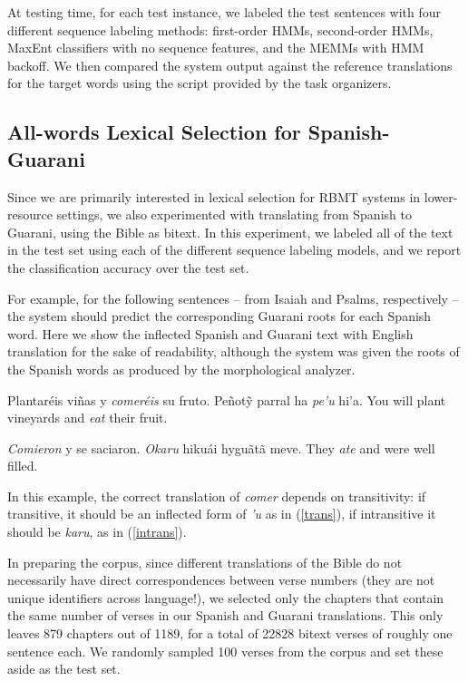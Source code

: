 At testing time, for each test instance, we labeled the test sentences with
four different sequence labeling methods: first-order HMMs, second-order HMMs,
MaxEnt classifiers with no sequence features, and the MEMMs with HMM backoff.
We then compared the system output against the reference translations for the
target words using the script provided by the task organizers.

\subsection{All-words Lexical Selection for Spanish-Guarani}
Since we are primarily interested in lexical selection for RBMT systems in
lower-resource settings, we also experimented with translating from Spanish to
Guarani, using the Bible as bitext. In this experiment, we labeled all of the
text in the test set using each of the different sequence labeling models, and
we report the classification accuracy over the test set.

For example, for the following sentences -- from Isaiah and Psalms,
respectively -- the system should predict the corresponding Guarani roots for
each Spanish word. Here we show the inflected Spanish and Guarani text with
English translation for the sake of readability, although the system was given
the roots of the Spanish words as produced by the morphological analyzer.

\begin{exe}
\ex\label{trans} \begin{xlist}
\ex Plantaréis viñas y \emph{comeréis} su fruto.
\ex Peñot\~{y} parral ha \emph{pe'u} hi'a.
\ex You will plant vineyards and \emph{eat} their fruit.
\end{xlist}

\ex\label{intrans} \begin{xlist}
\ex \emph{Comieron} y se saciaron.
\ex \emph{Okaru} hikuái hyguãtã meve.
\ex They \emph{ate} and were well filled.
\end{xlist}
\end{exe}

In this example, the correct translation of \emph{comer} depends on
transitivity: if transitive, it should be an inflected form of \emph{'u} as in
(\ref{trans}), if intransitive it should be \emph{karu}, as in (\ref{intrans}).

In preparing the corpus, since different translations of the Bible do not
necessarily have direct correspondences between verse numbers (they are not
unique identifiers across language!), we selected only the chapters that contain
the same number of verses in our Spanish and Guarani translations.  This only
leaves 879 chapters out of 1189, for a total of 22828 bitext verses of
roughly one sentence each. We randomly sampled 100 verses from the corpus and
set these aside as the test set.

